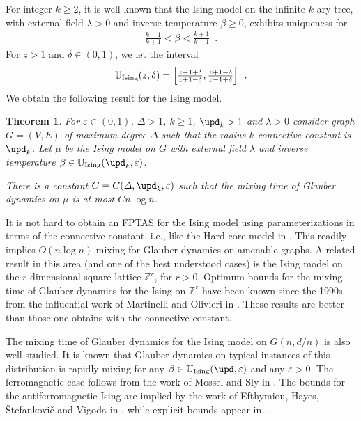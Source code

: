 \documentclass[11pt,reqno]{amsart}
\numberwithin{equation}{section}
\newtheorem{theorem}{Theorem}[section]
\newcommand{\bluepigment}[1]{{\color{blue(pigment)}#1}}
\newcommand{\bostonuniversityred}[1]{{\color{bostonuniversityred}#1}}
\newcommand{\cadmiumgreen}[1]{{\color{cadmiumgreen}#1}}
\newcommand{\goldenbrown}[1]{{\color{goldenbrown}#1}}
\newcommand{\red}[1]{{\color{red}#1}}
\newcommand{\maxDeg}{{\Delta}}
\newcommand{\cconnective}{\goldenbrown{\upd}}
\newcommand{\UnIsing}{{\mathbb{U}_{\rm Ising}}}
\renewcommand{\bluepigment}[1]{#1}
\renewcommand{\bostonuniversityred}[1]{#1}
\renewcommand{\cadmiumgreen}[1]{#1}
\renewcommand{\goldenbrown}[1]{#1}
\renewcommand{\red}[1]{#1}
\newcommand{\kd}{\goldenbrown{d}}
\newcommand{\kk}{\bluepigment{k}}
\newcommand{\kr}{\bostonuniversityred{r}}%
\newcommand{\kz}{\cadmiumgreen{z}}
\renewcommand{\kd}{d}
\renewcommand{\kk}{k}
\renewcommand{\kr}{r}
\renewcommand{\kz}{z}
\begin{document}
%
For  integer $\kk\geq 2$, it is  well-known  that  the Ising model  on the infinite $\kk$-ary tree, with external field  $\lambda>0$ 
and inverse temperature $\beta\geq 0$,  exhibits uniqueness for 
\begin{align}\nonumber
\frac{\kk-1}{\kk+1} <\beta< \frac{\kk+1}{\kk-1} \enspace .
\end{align}
%
%
For $\kz>1$ and $\delta\in (0,1)$, we let the interval
\begin{align}\label{eq:DefOfIsingUniquReg}
\UnIsing(\kz,\delta) =\textstyle \left [ \frac{\kz-1+\delta}{\kz+1-\delta},   \frac{\kz+1-\delta}{\kz-1+\delta}\right] \enspace.
\end{align}
We obtain the following result for the Ising model. 
% 
%
\begin{theorem}\label{thrm:Ising4CCK}
For $\varepsilon\in (0,1)$, $\maxDeg >1$, $\kk\geq 1$, $\cconnective_{\kk}>1$ and $\lambda>0$ 
consider graph $G=(V,E)$ of maximum degree $\maxDeg$ such that the radius-$\kk$ connective constant is $\cconnective_{\kk}$.
%
Let $\mu$ be the Ising model on $G$ with external field $\lambda$ and inverse temperature $\beta\in \UnIsing(\cconnective_{\kk},\varepsilon)$. 

There is a constant $C={C( \maxDeg,\cconnective_{\kk}, \varepsilon)}$ such that the mixing time of Glauber dynamics 
on $\mu$ is at most $C n\log n$. 
\end{theorem}

It is not hard to obtain  an FPTAS for the Ising model using parameterizations  in 
terms of  the connective constant, i.e., like the Hard-core model  in 
\cite{ConnectiveConstFirst,ConnectiveConst}. 
This  readily implies $O(n\log n)$ mixing for Glauber dynamics on amenable graphs. 
A related result in this area (and  one of the best understood cases) is  the Ising model on 
the  $\kr$-dimensional  square lattice $\mathbb{Z}^{\kr}$, 
for $\kr>0$.  Optimum bounds for the mixing time of Glauber dynamics for the Ising on $\mathbb{Z}^{\kr}$ have  been known since the 1990s from 
the influential work of Martinelli  and Olivieri in \cite{MartinelliOlivieriA,MartinelliOlivieriB}. These  results are 
better than those one obtains with the connective constant.
% 



The mixing time of  Glauber dynamics for the Ising model on  $G(n,\kd/n)$ is also well-studied. 
It is known that  Glauber dynamics on typical instances of this distribution is rapidly mixing  for  any 
$\beta\in \UnIsing(\cconnective,\varepsilon)$ and any $\varepsilon>0$.   The ferromagnetic case follows from  the 
work of Mossel and Sly in   \cite{ISINGGNPMS}. The bounds for the antiferromagnetic Ising are implied by  the work of 
Efthymiou, Hayes, \v Stefankovi\v c and Vigoda in \cite{Efth19}, while  explicit bounds appear in   \cite{Efth24}.
\end{document}
